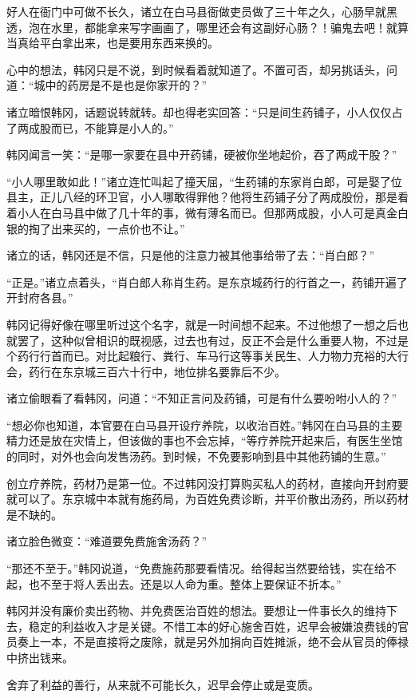 好人在衙门中可做不长久，诸立在白马县衙做吏员做了三十年之久，心肠早就黑透，泡在水里，都能拿来写字画画了，哪里还会有这副好心肠？！骗鬼去吧！就算当真给平白拿出来，也是要用东西来换的。

心中的想法，韩冈只是不说，到时候看着就知道了。不置可否，却另挑话头，问道：“城中的药房是不是也是你家开的？”

诸立暗恨韩冈，话题说转就转。却也得老实回答：“只是间生药铺子，小人仅仅占了两成股而已，不能算是小人的。”

韩冈闻言一笑：“是哪一家要在县中开药铺，硬被你坐地起价，吞了两成干股？”

“小人哪里敢如此！”诸立连忙叫起了撞天屈，“生药铺的东家肖白郎，可是娶了位县主，正儿八经的环卫官，小人哪敢得罪他？他将生药铺子分了两成股份，那是看着小人在白马县中做了几十年的事，微有薄名而已。但那两成股，小人可是真金白银的掏了出来买的，一点价也不让。”

诸立的话，韩冈还是不信，只是他的注意力被其他事给带了去：“肖白郎？”

“正是。”诸立点着头，“肖白郎人称肖生药。是东京城药行的行首之一，药铺开遍了开封府各县。”

韩冈记得好像在哪里听过这个名字，就是一时间想不起来。不过他想了一想之后也就罢了，这种似曾相识的既视感，过去也有过，反正不会是什么重要人物，不过是个药行行首而已。对比起粮行、粪行、车马行这等事关民生、人力物力充裕的大行会，药行在东京城三百六十行中，地位排名要靠后不少。

诸立偷眼看了看韩冈，问道：“不知正言问及药铺，可是有什么要吩咐小人的？”

“想必你也知道，本官要在白马县开设疗养院，以收治百姓。”韩冈在白马县的主要精力还是放在灾情上，但该做的事也不会忘掉，“等疗养院开起来后，有医生坐馆的同时，对外也会向发售汤药。到时候，不免要影响到县中其他药铺的生意。”

创立疗养院，药材乃是第一位。不过韩冈没打算购买私人的药材，直接向开封府要就可以了。东京城中本就有施药局，为百姓免费诊断，并平价散出汤药，所以药材是不缺的。

诸立脸色微变：“难道要免费施舍汤药？”

“那还不至于。”韩冈说道，“免费施药那要看情况。给得起当然要给钱，实在给不起，也不至于将人丢出去。还是以人命为重。整体上要保证不折本。”

韩冈并没有廉价卖出药物、并免费医治百姓的想法。要想让一件事长久的维持下去，稳定的利益收入才是关键。不惜工本的好心施舍百姓，迟早会被嫌浪费钱的官员奏上一本，不是直接将之废除，就是另外加捐向百姓摊派，绝不会从官员的俸禄中挤出钱来。

舍弃了利益的善行，从来就不可能长久，迟早会停止或是变质。

